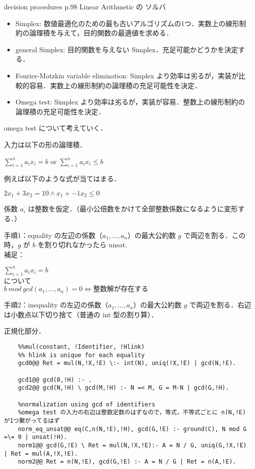 decision procedures p.98
Linear Arithmetic の ソルバ
\begin{itemize}
    \item Simplex: 数値最適化のための最も古いアルゴリズムの1つ．実数上の線形制約の論理積を与えて，目的関数の最適値を求める．
    \item general Simplex: 目的関数を与えない Simplex．充足可能かどうかを決定する．
    \item Fourier-Motzkin variable elimination: Simplex より効率は劣るが，実装が比較的容易．実数上の線形制約の論理積の充足可能性を決定．
    \item Omega test: Simplex より効率は劣るが，実装が容易．整数上の線形制約の論理積の充足可能性を決定．
\end{itemize}

omega test について考えていく．

入力は以下の形の論理積．
\begin{center}
    $ \sum_{i=1}^na_ix_i=b$ or $\sum_{i=1}^na_ix_i\leq b$
\end{center}
例えば以下のような式が当てはまる．
\begin{center}
    $ 2x_1 + 3x_2 = 10 \wedge x_1 + -1x_2\leq 0$
\end{center}
係数 $a_i$ は整数を仮定．（最小公倍数をかけて全部整数係数になるように変形する．）

手順1：equality の左辺の係数（$a_1,\dots,a_n$）の最大公約数 $g$ で両辺を割る．この時，$g$ が $b$ を割り切れなかったら unsat.\\
補足：
\begin{center}
    $ \sum_{i=1}^na_ix_i=b$\\
    について\\
    $b \:mod\: gcd(a_1,\dots,a_n) = 0 \Leftrightarrow 整数解が存在する$
\end{center}


手順2：inequality の左辺の係数（$a_1,\dots,a_n$）の最大公約数 $g$ で両辺を割る．右辺は小数点以下切り捨て（普通の int 型の割り算）．

正規化部分．
\begin{lstlisting}
    %%mul(constant, !Identifier, !Hlink)
    %% hlink is unique for each equality
    gcd0@@ Ret = mul(N,!X,!E) \:- int(N), uniq(!X,!E) | gcd(N,!E).
    
    gcd1@@ gcd(0,!H) :- .
    gcd2@@ gcd(N,!H) \ gcd(M,!H) :- N =< M, G = M-N | gcd(G,!H).
    
    %normalization using gcd of identifiers 
    %omega test の入力の右辺は整数定数のはずなので，等式，不等式ごとに n(N,!E) が1つ繋がってるはず
    norm_eq_unsat@@ eq(C,n(N,!E),!H), gcd(G,!E) :- ground(C), N mod G =\= 0 | unsat(!H).
    norm1@@ gcd(G,!E) \ Ret = mul(N,!X,!E):- A = N / G, uniq(G,!X,!E) | Ret = mul(A,!X,!E).
    norm2@@ Ret = n(N,!E), gcd(G,!E) :- A = N / G | Ret = n(A,!E).
\end{lstlisting}

